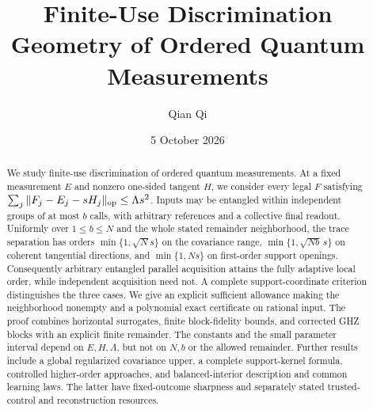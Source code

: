 \documentclass[11pt]{amsart}
\title[Finite-use discrimination geometry]{Finite-Use Discrimination Geometry of Ordered Quantum Measurements}
\author{Qian Qi}
\date{5 October 2026}
\numberwithin{equation}{section}
\theoremstyle{definition}\newtheorem{definition}[theorem]{Definition}
\theoremstyle{remark}\newtheorem{remark}[theorem]{Remark}
\begin{document}
\raggedbottom
\begin{abstract}
We study finite-use discrimination of ordered quantum measurements.
At a fixed measurement $E$ and nonzero one-sided tangent $H$, we
consider every legal $F$ satisfying
$\sum_j\|F_j-E_j-sH_j\|_{\rm op}\le\Lambda s^2$.
Inputs may be entangled within independent groups of at most $b$
calls, with arbitrary references and a collective final readout.
Uniformly over $1\le b\le N$ and the whole stated remainder
neighborhood, the trace separation has orders
$\min\{1,\sqrt N s\}$ on the covariance range,
$\min\{1,\sqrt{Nb}\,s\}$ on coherent tangential directions,
and $\min\{1,Ns\}$ on first-order support openings.
Consequently arbitrary entangled parallel acquisition attains the
fully adaptive local order, while independent acquisition need not.
A complete support-coordinate criterion distinguishes the three cases.
We give an explicit sufficient allowance making the neighborhood
nonempty and a polynomial exact certificate on rational input.
The proof combines horizontal surrogates, finite block-fidelity
bounds, and corrected GHZ blocks with an explicit finite remainder.
The constants and the small parameter interval depend on
$E,H,\Lambda$, but not on $N,b$ or the allowed remainder.
Further results include a global regularized covariance upper,
a complete support-kernel formula, controlled higher-order approaches,
and balanced-interior description and common learning laws.
The latter have fixed-outcome sharpness and separately stated
trusted-control and reconstruction resources.
\end{abstract}
\maketitle

















\end{document}
